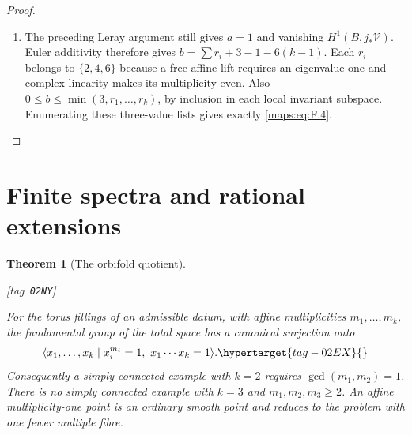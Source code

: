 \documentclass[11pt,a4paper]{article}
\numberwithin{equation}{section}
\newtheorem{theorem}{Theorem}[section]
\theoremstyle{definition}
\newcommand{\StatementRecord}[4]{{\upshape\footnotesize[tag~\texttt{#3}]}\enspace\ignorespaces}
\begin{document}
\begin{proof}
\begin{enumerate}[label=\arabic*.]
\item The preceding Leray argument still gives $a=1$ and vanishing
$H^1(B,j_*\mathcal V)$.  Euler additivity therefore gives
$b=\sum r_i+3-1-6(k-1)$.  Each $r_i$ belongs to
$\{2,4,6\}$ because a free affine lift requires an eigenvalue
one and complex linearity makes its multiplicity even.
Also $0\leq b\leq\min(3,r_1,\ldots,r_k)$, by inclusion in
each local invariant subspace.  Enumerating these three-value
lists gives exactly \eqref{maps:eq:F.4}.

\end{enumerate}
\end{proof}






\section{Finite spectra and rational extensions}\label{pub:V:sec-spectra}



\begin{theorem}[The orbifold quotient]\hypertarget{tag-02NY}{}\label{maps:src:F.2.7}
\StatementRecord{maps:src:F.2.7}{proved}{02NY}{the definitions and constructions stated in the proof}


For the torus fillings of an admissible datum, with affine
multiplicities $m_1,\ldots,m_k$, the fundamental group of the
total space has a canonical surjection onto
\begin{equation}
 \langle x_1,\ldots,x_k\mid
       x_i^{m_i}=1,\ x_1\cdots x_k=1\rangle.
 \hypertarget{tag-02EX}{}\label{maps:eq:F.27}
\end{equation}
Consequently a simply connected example with $k=2$ requires
$\gcd(m_1,m_2)=1$.  There is no simply connected example with
$k=3$ and $m_1,m_2,m_3\geq2$.  An affine multiplicity-one
point is an ordinary smooth point and reduces to the problem
with one fewer multiple fibre.

\end{theorem}
\end{document}
